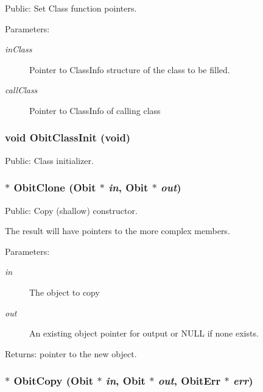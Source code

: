 Public: Set Class function pointers. 

\begin{Desc}
\item[Parameters:]
\begin{description}
\item[{\em in\-Class}]Pointer to Class\-Info structure of the class to be filled. \item[{\em call\-Class}]Pointer to Class\-Info of calling class \end{description}
\end{Desc}
\subsubsection{\setlength{\rightskip}{0pt plus 5cm}void Obit\-Class\-Init (void)}\label{Obit_8c_a15}


Public: Class initializer. 

\subsubsection{$\ast$ Obit\-Clone ({\bf Obit} $\ast$ {\em in}, {\bf Obit} $\ast$ {\em out})}\label{Obit_8c_a7}


Public: Copy (shallow) constructor. 

The result will have pointers to the more complex members. \begin{Desc}
\item[Parameters:]
\begin{description}
\item[{\em in}]The object to copy \item[{\em out}]An existing object pointer for output or NULL if none exists. \end{description}
\end{Desc}
\begin{Desc}
\item[Returns:]pointer to the new object. \end{Desc}
\subsubsection{$\ast$ Obit\-Copy ({\bf Obit} $\ast$ {\em in}, {\bf Obit} $\ast$ {\em out}, {\bf Obit\-Err} $\ast$ {\em err})}\label{Obit_8c_a6}


